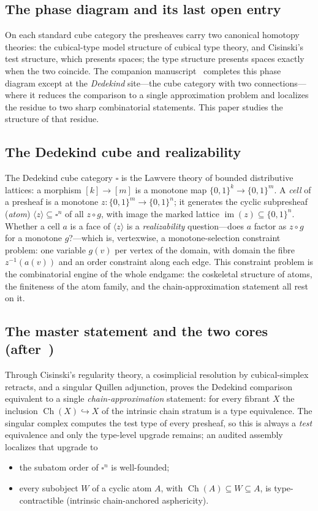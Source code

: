 \documentclass[11pt]{amsart}
\theoremstyle{plain}
\theoremstyle{definition}
\DeclareMathOperator{\im}{im}
\DeclareMathOperator{\Ch}{Ch}
\newcommand{\B}{\{0,1\}}
\newcommand{\cube}{\square}
\newcommand{\atom}[1]{\langle #1 \rangle}
\begin{document}
\subsection*{The phase diagram and its last open entry}
On each standard cube category the presheaves carry two canonical
homotopy theories: the cubical-type model structure of cubical type
theory, and Cisinski's test structure, which presents spaces; the type
structure presents spaces exactly when the two coincide.  The companion
manuscript~\cite{PaperW} completes this phase diagram except at the
\emph{Dedekind} site---the cube category with two connections---where it
reduces the comparison to a single approximation problem and localizes
the residue to two sharp combinatorial statements.  This paper studies
the structure of that residue.

\subsection*{The Dedekind cube and realizability}
The Dedekind cube category $\cube$ is the Lawvere theory of bounded
distributive lattices: a morphism $[k]\to[m]$ is a monotone map
$\B^k\to\B^m$.  A \emph{cell} of a presheaf is a monotone
$z\colon\B^m\to\B^n$; it generates the cyclic subpresheaf (\emph{atom})
$\atom{z}\subseteq\cube^n$ of all $z\circ g$, with image the marked
lattice $\im(z)\subseteq\B^n$.  Whether a cell $a$ is a face of $\atom z$
is a \emph{realizability} question---does $a$ factor as $z\circ g$ for a
monotone $g$?---which is, vertexwise, a monotone-selection constraint
problem: one variable $g(v)$ per vertex of the domain, with domain the
fibre $z^{-1}(a(v))$ and an order constraint along each edge.  This
constraint problem is the combinatorial engine of the whole endgame:
the coskeletal structure of atoms, the finiteness of the atom family,
and the chain-approximation statement all rest on it.

\subsection*{The master statement and the two cores (after~\cite{PaperW})}
Through Cisinski's regularity theory, a cosimplicial resolution by
cubical-simplex retracts, and a singular Quillen adjunction, \cite{PaperW}
proves the Dedekind comparison equivalent to a single
\emph{chain-approximation} statement: for every fibrant $X$ the inclusion
$\Ch(X)\hookrightarrow X$ of the intrinsic chain stratum is a type
equivalence.  The singular complex computes the test type of every
presheaf, so this is always a \emph{test} equivalence and only the
type-level upgrade remains; an audited assembly localizes that upgrade to
\begin{itemize}
\item[(a)] the subatom order of $\cube^n$ is well-founded;
\item[(b)] every subobject $W$ of a cyclic atom $A$, with $\Ch(A)
  \subseteq W\subseteq A$, is type-contractible (intrinsic
  chain-anchored asphericity).
\end{itemize}
\end{document}
